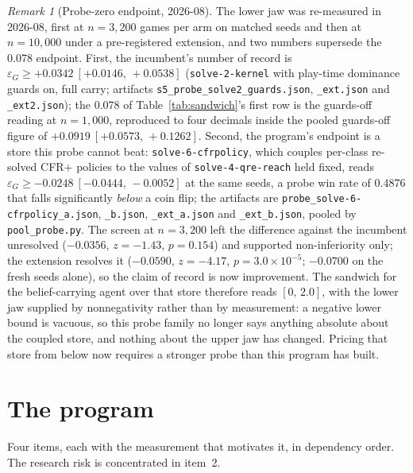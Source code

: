 \documentclass[11pt]{article}
\theoremstyle{plain}
\theoremstyle{definition}
\theoremstyle{remark}
\newtheorem{remark}[theorem]{Remark}
\newcommand{\code}[1]{\texttt{\small #1}}
\newcommand{\game}{\ensuremath{G}}
\newcommand{\epsG}{\ensuremath{\varepsilon_{\game}}}
\begin{document}
\begin{remark}[Probe-zero endpoint, 2026-08]\label{rem:probezero}
The lower jaw was re-measured in 2026-08, first at $n=3{,}200$ games
per arm on matched seeds and then at $n=10{,}000$ under a
pre-registered extension, and two numbers supersede the $0.078$
endpoint. First, the incumbent's number of record is
$\epsG \ge +0.0342\ [+0.0146,\,+0.0538]$ (\code{solve-2-kernel} with
play-time dominance guards on, full carry; artifacts
\code{s5\_probe\_solve2\_guards.json}, \code{\_ext.json} and
\code{\_ext2.json}); the
$0.078$ of
Table~\ref{tab:sandwich}'s first row is the guards-off reading at
$n=1{,}000$, reproduced to four decimals inside the pooled guards-off
figure of $+0.0919\ [+0.0573,\,+0.1262]$. Second, the program's
endpoint is a store this probe cannot beat: \code{solve-6-cfrpolicy},
which couples per-class re-solved CFR+ policies to the values of
\code{solve-4-qre-reach} held fixed, reads
$\epsG \ge -0.0248\ [-0.0444,\,-0.0052]$ at the same seeds, a probe
win rate of $0.4876$ that falls significantly \emph{below} a coin
flip; the artifacts are \code{probe\_solve-6-cfrpolicy\_a.json},
\code{\_b.json}, \code{\_ext\_a.json} and \code{\_ext\_b.json}, pooled
by \code{pool\_probe.py}. The screen at $n=3{,}200$ left the
difference against the incumbent unresolved ($-0.0356$, $z=-1.43$,
$p=0.154$) and supported non-inferiority only; the extension resolves
it ($-0.0590$, $z=-4.17$, $p=3.0\times10^{-5}$; $-0.0700$ on the fresh
seeds alone), so the claim of record is now improvement. The sandwich
for the belief-carrying agent over that store therefore reads
$[0,\,2.0]$, with the lower jaw
supplied by nonnegativity rather than by measurement: a negative lower
bound is vacuous, so this probe family no longer says anything
absolute about the coupled store, and nothing about the upper jaw has
changed. Pricing that store from below now requires a stronger probe
than this program has built.
\end{remark}

\section{The program}\label{sec:program}

Four items, each with the measurement that motivates it, in
dependency order. The research risk is concentrated in item~2.
\end{document}
